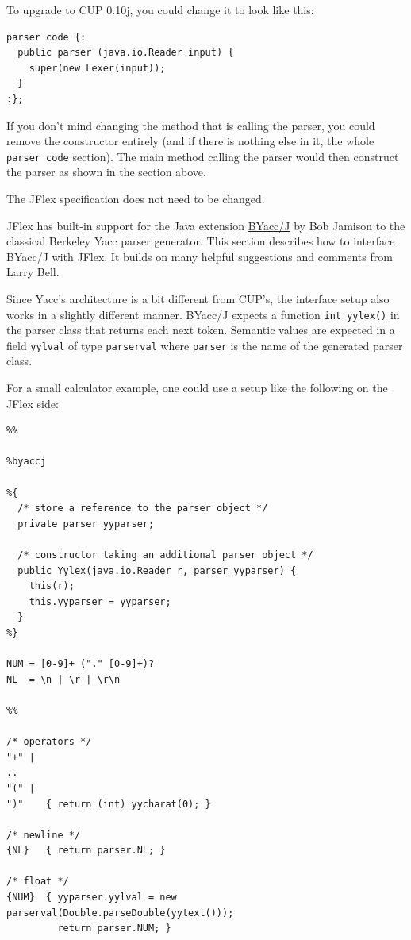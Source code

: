 To upgrade to CUP 0.10j, you could change it to look like this:

\begin{verbatim}
parser code {:
  public parser (java.io.Reader input) {
    super(new Lexer(input));
  }
:};
\end{verbatim}

If you don't mind changing the method that is calling the parser, you
could remove the constructor entirely (and if there is nothing else in
it, the whole \texttt{parser\ code} section). The main method calling
the parser would then construct the parser as shown in the section
above.

The JFlex specification does not need to be changed.


JFlex has built-in support for the Java extension
\href{http://byaccj.sourceforge.net/}{BYacc/J} \autocite{BYaccJ} by Bob
Jamison to the classical Berkeley Yacc parser generator. This section
describes how to interface BYacc/J with JFlex. It builds on many helpful
suggestions and comments from Larry Bell.

Since Yacc's architecture is a bit different from CUP's, the interface
setup also works in a slightly different manner. BYacc/J expects a
function \texttt{int\ yylex()} in the parser class that returns each
next token. Semantic values are expected in a field \texttt{yylval} of
type \texttt{parserval} where \texttt{parser} is the name of the
generated parser class.

For a small calculator example, one could use a setup like the following
on the JFlex side:

\begin{verbatim}
%%

%byaccj

%{
  /* store a reference to the parser object */
  private parser yyparser;

  /* constructor taking an additional parser object */
  public Yylex(java.io.Reader r, parser yyparser) {
    this(r);
    this.yyparser = yyparser;
  }
%}

NUM = [0-9]+ ("." [0-9]+)?
NL  = \n | \r | \r\n

%%

/* operators */
"+" | 
..
"(" | 
")"    { return (int) yycharat(0); }

/* newline */
{NL}   { return parser.NL; }

/* float */
{NUM}  { yyparser.yylval = new parserval(Double.parseDouble(yytext()));
         return parser.NUM; }
\end{verbatim}

